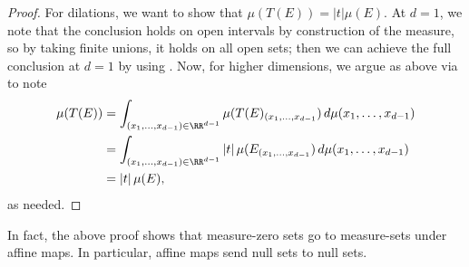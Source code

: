 \documentclass[../notes.tex]{subfiles}
\begin{document}
\begin{proof}
	For dilations, we want to show that $\mu(T(E))=\left|t\right|\mu(E)$. At $d=1$, we note that the conclusion holds on open intervals by construction of the measure, so by taking finite unions, it holds on all open sets; then we can achieve the full conclusion at $d=1$ by using . Now, for higher dimensions, we argue as above via  to note
	\begin{align*}
		\mu(T(E)) &= \int_{(x_1,\ldots,x_{d-1})\in\RR^{d-1}}\mu(T(E)_{(x_1,\ldots,x_{d-1}})\,d\mu(x_1,\ldots,x_{d-1}) \\
		&= \int_{(x_1,\ldots,x_{d-1})\in\RR^{d-1}}\left|t\right|\mu(E_{(x_1,\ldots,x_{d-1}})\,d\mu(x_1,\ldots,x_{d-1}) \\
		&= \left|t\right|\mu(E),
	\end{align*}
	as needed.
\end{proof}
\begin{remark}
	In fact, the above proof shows that measure-zero sets go to measure-sets under affine maps. In particular, affine maps send null sets to null sets.
\end{remark}
\end{document}
